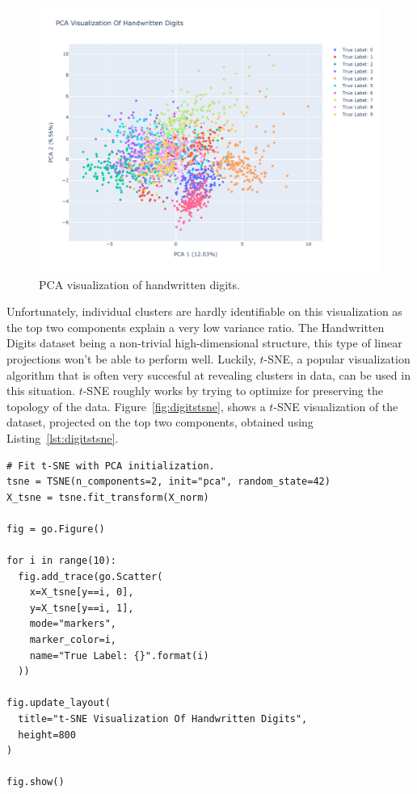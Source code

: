 \documentclass[12pt]{article}
\begin{document}
  \begin{figure}[!ht]
    \centering
    \includegraphics[width=\textwidth]{figures/digitspca}
    \caption{PCA visualization of handwritten digits.}%
    \label{fig:digitspca}
  \end{figure} 

  Unfortunately, individual clusters are hardly identifiable on this
  visualization as the top two components explain a very low variance ratio.
  The Handwritten Digits dataset being a non-trivial high-dimensional
  structure, this type of linear projections won't be able to perform well.
  Luckily, $t$-SNE, a popular visualization algorithm that is often very
  succesful at revealing clusters in data, can be used in this situation.
  $t$-SNE roughly works by trying to optimize for preserving the topology of
  the data. Figure~\ref{fig:digitstsne}, shows a $t$-SNE visualization of the
  dataset, projected on the top two components, obtained using
  Listing~\ref{lst:digitstsne}.

  \newpage

  \begin{lstlisting}[caption={Perform $t$-SNE and project on top two
  components.}, captionpos=b, label={lst:digitstsne}]
# Fit t-SNE with PCA initialization.
tsne = TSNE(n_components=2, init="pca", random_state=42)
X_tsne = tsne.fit_transform(X_norm)

fig = go.Figure()

for i in range(10):
  fig.add_trace(go.Scatter(
    x=X_tsne[y==i, 0],
    y=X_tsne[y==i, 1],
    mode="markers",
    marker_color=i,
    name="True Label: {}".format(i)
  ))

fig.update_layout(
  title="t-SNE Visualization Of Handwritten Digits",
  height=800
)
    
fig.show()
  \end{lstlisting}
\end{document}
